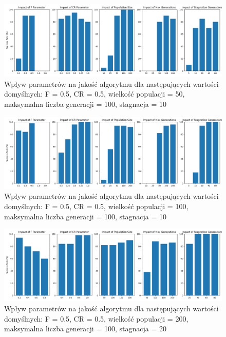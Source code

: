 \documentclass{article}
\begin{document}
\begin{figure}[H]
    \centering
    \includegraphics[width=\textwidth]{parameter_tuning_results_separate1.png}
    \caption{Wpływ parametrów na jakość algorytmu dla następujących wartości domyślnych: F = 0.5, CR = 0.5, wielkość populacji = 50, maksymalna liczba generacji = 100, stagnacja = 10}
    \label{fig:parameter_results1}
\end{figure}

\begin{figure}[H]
    \centering
    \includegraphics[width=\textwidth]{parameter_tuning_results_separate2.png}
    \caption{Wpływ parametrów na jakość algorytmu dla następujących wartości domyślnych: F = 0.5, CR = 0.5, wielkość populacji = 100, maksymalna liczba generacji = 100, stagnacja = 10}
    \label{fig:parameter_results2}
\end{figure}

\begin{figure}[H]
    \centering
    \includegraphics[width=\textwidth]{parameter_tuning_results_separate3.png}
    \caption{Wpływ parametrów na jakość algorytmu dla następujących wartości domyślnych: F = 0.5, CR = 0.5, wielkość populacji = 200, maksymalna liczba generacji = 100, stagnacja = 20}
    \label{fig:parameter_results3}
\end{figure}
\end{document}
